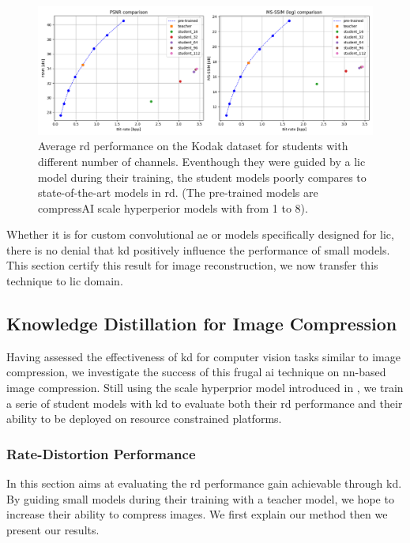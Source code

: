 \documentclass{article}
\begin{document}
\begin{figure}
    \centering
    \includegraphics[width=15cm]{../img/kd_ae_rd.png}
    \caption[Average \acrshort{rd} performance on the Kodak dataset for students with different number of channels.]{Average \acrshort{rd} performance on the Kodak dataset for students with different number of channels. Eventhough they were guided by a \acrshort{lic} model during their training, the student models poorly compares to state-of-the-art models in \acrshort{rd}. (The pre-trained models are compressAI scale hyperperior models with  from 1 to 8).}
    \label{kd_ae_2}
\end{figure}

Whether it is for custom convolutional \acrshort{ae} or models specifically designed for \acrshort{lic}, there is no denial that \acrshort{kd} positively influence the performance of small models. This section certify this result for image reconstruction, we now transfer this technique to \acrshort{lic} domain.

\subsection{Knowledge Distillation for Image Compression}
Having assessed the effectiveness of \acrshort{kd} for computer vision tasks similar to image compression, we investigate the success of this frugal \acrshort{ai} technique on \acrshort{nn}-based image compression. Still using the scale hyperprior model introduced in \cite{balle2018variationalimagecompressionscale}, we train a serie of student models with \acrshort{kd} to evaluate both their \acrshort{rd} performance and their ability to be deployed on resource constrained platforms.

\subsubsection{Rate-Distortion Performance}
In this section aims at evaluating the \acrshort{rd} performance gain achievable through \acrshort{kd}. By guiding small models during their training with a teacher model, we hope to increase their ability to compress images. We first explain our method then we present our results.
\end{document}
